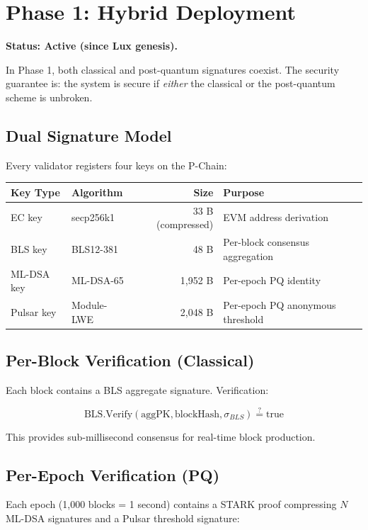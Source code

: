 \section{Phase 1: Hybrid Deployment}


\textbf{Status: Active (since Lux genesis).}

In Phase 1, both classical and post-quantum signatures coexist. The security guarantee is: the system is secure if \emph{either} the classical or the post-quantum scheme is unbroken.

\subsection{Dual Signature Model}

Every validator registers four keys on the P-Chain:

\begin{center}
\begin{tabular}{llrl}
\toprule
\textbf{Key Type} & \textbf{Algorithm} & \textbf{Size} & \textbf{Purpose} \\
\midrule
EC key & secp256k1 & 33 B (compressed) & EVM address derivation \\
BLS key & BLS12-381 & 48 B & Per-block consensus aggregation \\
ML-DSA key & ML-DSA-65 & 1,952 B & Per-epoch PQ identity \\
Pulsar key & Module-LWE & 2,048 B & Per-epoch PQ anonymous threshold \\
\bottomrule
\end{tabular}
\end{center}

\subsection{Per-Block Verification (Classical)}

Each block contains a BLS aggregate signature. Verification:

$$\text{BLS.Verify}(\text{aggPK}, \text{blockHash}, \sigma_{BLS}) \stackrel{?}{=} \text{true}$$

This provides sub-millisecond consensus for real-time block production.

\subsection{Per-Epoch Verification (PQ)}

Each epoch (1,000 blocks = 1 second) contains a STARK proof compressing $N$ ML-DSA signatures and a Pulsar threshold signature:

